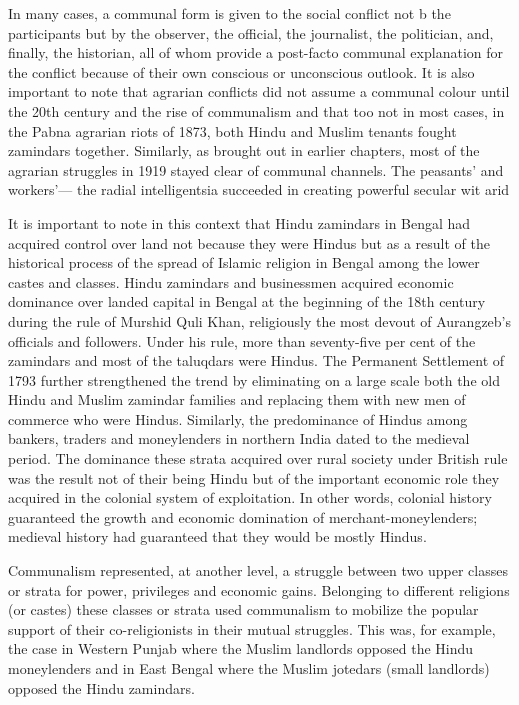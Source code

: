 In many cases, a communal form is given to the social conflict not b the participants but by the observer, the official, the journalist, the politician, and, finally, the historian, all of whom provide a post-facto communal explanation for the conflict because of their own conscious or unconscious outlook. It is also important to note that agrarian conflicts did not assume a communal colour until the 20th century and the rise of communalism and that too not in most cases, in the Pabna agrarian riots of 1873, both Hindu and Muslim tenants fought zamindars together. Similarly, as brought out in earlier chapters, most of the agrarian struggles in 1919 stayed clear of communal channels. The peasants' and workers'— the radial intelligentsia succeeded in creating powerful secular wit arid %

It is important to note in this context that Hindu zamindars in Bengal had acquired control over land not because they were Hindus but as a result of the historical process of the spread of Islamic religion in Bengal among the lower castes and classes. Hindu zamindars and businessmen acquired economic dominance over landed capital in Bengal at the beginning of the 18th century during the rule of Murshid Quli Khan, religiously the most devout of Aurangzeb's officials and followers. Under his rule, more than seventy-five per cent of the zamindars and most of the taluqdars were Hindus. The Permanent Settlement of 1793 further strengthened the trend by eliminating on a large scale both the old Hindu and Muslim zamindar families and replacing them with new men of commerce who were Hindus. Similarly, the predominance of Hindus among bankers, traders and moneylenders in northern India dated to the medieval period. The dominance these strata acquired over rural society under British rule was the result not of their being Hindu but of the important economic role they acquired in the colonial system of exploitation. In other words, colonial history guaranteed the growth and economic domination of merchant-moneylenders; medieval history had guaranteed that they would be mostly Hindus. 

Communalism represented, at another level, a struggle between two upper classes or strata for power, privileges and economic gains. Belonging to different religions (or castes) these classes or strata used communalism to mobilize the popular support of their co-religionists in their mutual struggles. This was, for example, the case in Western Punjab where the Muslim landlords opposed the Hindu moneylenders and in East Bengal where the Muslim jotedars (small landlords) opposed the Hindu zamindars.

